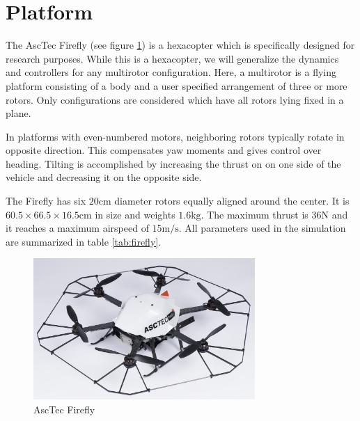 \section{Platform}
The AscTec Firefly (see figure \ref{pics:firefly}) is a hexacopter which is specifically designed for research purposes. While this is a hexacopter, we will generalize the dynamics and controllers for any multirotor configuration. Here, a multirotor is a flying platform consisting of a body and a user specified arrangement of three or more rotors. Only configurations are considered which have all rotors lying fixed in a plane.

In platforms with even-numbered motors, neighboring rotors typically rotate in opposite direction. This compensates yaw moments and gives control over heading. Tilting is accomplished by increasing the thrust on on one side of the vehicle and decreasing it on the opposite side.

The Firefly has six $20 \si{\cm}$ diameter rotors equally aligned around the center. It is $60.5 \times 66.5 \times 16.5 \si{\cm}$ in size and weights $1.6 \si{\kg}$. The maximum thrust is $36 \si{\N}$ and it reaches a maximum airspeed of $15 \si{\metre\per\second}$. All parameters used in the simulation are summarized in table \ref{tab:firefly}.

\begin{figure}
   \centering
   \includegraphics[width=0.75\textwidth]{images/firefly.jpg}
   \caption{AscTec Firefly \cite{www:asctec}}
   \label{pics:firefly}
\end{figure}

